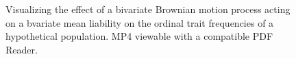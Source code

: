 \begin{figure}[h]
\centering
{}
\caption[Bivariate Brownian Motion Under the Threshold Model]{Visualizing the effect of a bivariate Brownian motion process acting on a bvariate mean liability on the ordinal trait frequencies of a hypothetical population. MP4 viewable with a compatible PDF Reader.}
\label{fig:bivBM}
\end{figure}

\closesupplement








